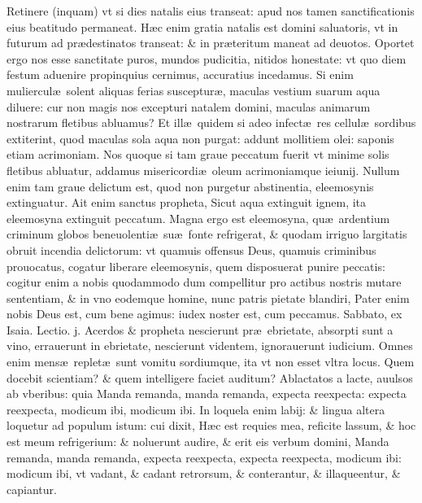 \documentclass[a5paper,10pt]{book}
\def\ae{æ}
\begin{document}
\begin{multicols*}{2}
Retinere (inquam) vt si dies natalis eius transeat: apud nos tamen sanctificationis eius beatitudo permaneat.
H\ae c enim gratia natalis est domini saluatoris, vt in futurum ad pr\ae destinatos transeat: \& in pr\ae teritum maneat ad deuotos.
Oportet ergo nos esse sanctitate puros, mundos pudicitia, nitidos honestate: vt quo diem festum aduenire propinquius cernimus, accuratius incedamus.
Si enim muliercul\ae \ solent aliquas ferias susceptur\ae , maculas vestium suarum aqua diluere: cur non magis nos excepturi natalem domini, maculas animarum nostrarum fletibus abluamus?
Et ill\ae \ quidem si adeo infect\ae \ res cellul\ae \ sordibus extiterint, quod maculas sola aqua non purgat:
addunt mollitiem olei: saponis etiam acrimoniam.
Nos quoque si tam graue peccatum fuerit vt minime solis fletibus abluatur, addamus misericordi\ae \ oleum acrimoniamque ieiunij.
Nullum enim tam graue delictum est, quod non purgetur abstinentia, eleemosynis extinguatur.
Ait enim sanctus propheta, Sicut aqua extinguit ignem, ita eleemosyna extinguit peccatum.
Magna ergo est eleemosyna, qu\ae \ ardentium criminum globos beneuolenti\ae \ su\ae \ fonte refrigerat, \& quodam irriguo largitatis obruit incendia delictorum: vt quamuis offensus Deus, quamuis criminibus prouocatus, cogatur liberare eleemosynis, quem disposuerat punire peccatis: cogitur enim a nobis quodammodo dum compellitur pro actibus nostris mutare sententiam, \& in vno eodemque homine, nunc patris pietate blandiri, Pater enim nobis Deus est, cum bene agimus: iudex noster est, cum peccamus.
\newline {} \color{red} \hypertarget{SAT-PRIMA-ADV}{Sabbato,} ex Isaia. \hfill Lectio. j. \color{black}
\vspace{-.5em}
Acerdos \& propheta nescierunt pr\ae \ ebrietate, absorpti sunt a vino, errauerunt in ebrietate, nescierunt videntem, ignorauerunt iudicium.
Omnes enim mens\ae \ replet\ae \ sunt vomitu sordiumque, ita vt non esset vltra locus.
Quem docebit scientiam? \& quem intelligere faciet auditum?
Ablactatos a lacte, auulsos ab vberibus: quia Manda remanda, manda remanda, expecta reexpecta: expecta reexpecta, modicum ibi, modicum ibi.
In loquela enim labij: \& lingua altera loquetur ad populum istum: cui dixit, H\ae c est requies mea, reficite lassum, \& hoc est meum refrigerium: \& noluerunt audire, \& erit eis verbum domini, Manda remanda, manda remanda, expecta reexpecta, expecta reexpecta, modicum ibi: modicum ibi, vt vadant, \& cadant retrorsum, \& conterantur, \& illaqueentur, \& capiantur.

\end{multicols*}
\end{document}
